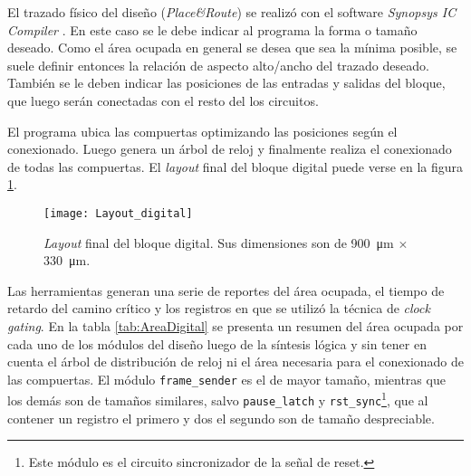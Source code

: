 El trazado físico del diseño (\emph{Place\&Route}) se realizó con el 
software \emph{Synopsys IC Compiler} \cite{SynopsysICCompiler}. En 
este caso se le debe indicar al programa la forma o tamaño deseado. 
Como el área ocupada en general se desea que sea la mínima posible, 
se suele definir entonces la relación de aspecto alto/ancho del 
trazado deseado. También se le deben indicar las posiciones de las 
entradas y salidas del bloque, que luego serán conectadas con el resto 
del los circuitos. 

El programa ubica las compuertas optimizando las 
posiciones según el conexionado. Luego genera un árbol de reloj y 
finalmente realiza el conexionado de todas las compuertas. El 
\emph{layout} final del bloque digital puede verse en la figura 
\ref{fig:LayoutBloqueDigital}.

\begin{figure}
	\centering
	\texttt{[image: Layout\_digital]}
	\caption{\emph{Layout} final del bloque digital. Sus dimensiones 
	son de \SI{900}{\micro\meter} \(\times\) \SI{330}{\micro\meter}.}
	\label{fig:LayoutBloqueDigital}
\end{figure}

Las herramientas generan una serie de reportes del área ocupada, el 
tiempo de retardo del camino crítico y los registros en que se 
utilizó la técnica de \emph{clock gating}. En la tabla 
\ref{tab:AreaDigital} se presenta un resumen del área ocupada por cada 
uno de los módulos del diseño luego de la síntesis lógica y sin 
tener en cuenta el árbol de distribución de reloj ni el área 
necesaria para el conexionado de las compuertas. El módulo 
\lstinline{frame_sender} es el de mayor tamaño, mientras que los 
demás son de tamaños similares, salvo \lstinline{pause_latch} y 
\lstinline{rst_sync}\footnote{Este módulo es el circuito sincronizador 
de la señal de reset.}, que al contener un registro el primero y dos el 
segundo son de tamaño despreciable. 

